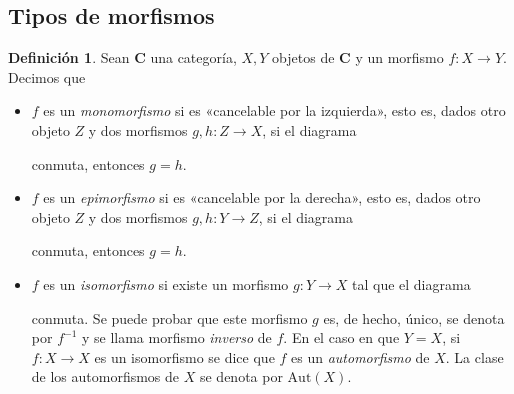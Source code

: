 \documentclass[12pt,a4paper]{book}
\theoremstyle{definition} \newtheorem{defn}[thm]{Definición}
\theoremstyle{definition} \newtheorem{ejemplo}[thm]{Ejemplo}
\theoremstyle{definition} \newtheorem{ejercicio}[thm]{Ejercicio}
\theoremstyle{remark} \newtheorem*{obs}{Observación}
\def\id{\mathbf{1}}
\def\cat{\mathbf{C}}
\def\aut{\mathrm{Aut}}
\begin{document}
\subsection{Tipos de morfismos}
\begin{defn}
  Sean $\cat$ una categoría, $X,Y$ objetos de $\cat$ y un morfismo $f:X\rightarrow Y$. Decimos que 
  \begin{itemize}
    \item $f$ es un \emph{monomorfismo} si es «cancelable por la izquierda», esto es, dados otro objeto $Z$ y dos morfismos $g,h:Z\rightarrow X$, si el diagrama
      \begin{center}
      \end{center}
      conmuta, entonces $g=h$.
    \item $f$ es un \emph{epimorfismo} si es «cancelable por la derecha», esto es, dados otro objeto $Z$ y dos morfismos $g,h:Y \rightarrow Z$, si el diagrama
      \begin{center}
      \end{center}
      conmuta, entonces $g=h$.
    \item $f$ es un \emph{isomorfismo} si existe un morfismo $g:Y\rightarrow X$ tal que el diagrama
  \begin{center}
  \end{center}
  conmuta. Se puede probar que este morfismo $g$ es, de hecho, único, se denota por $f^{-1}$ y se llama morfismo \emph{inverso} de $f$. En el caso en que $Y=X$, si $f:X\rightarrow X$ es un isomorfismo se dice que $f$ es un \emph{automorfismo} de $X$. La clase de los automorfismos de $X$ se denota por $\aut(X)$.
  \end{itemize}
\end{defn}
\end{document}
